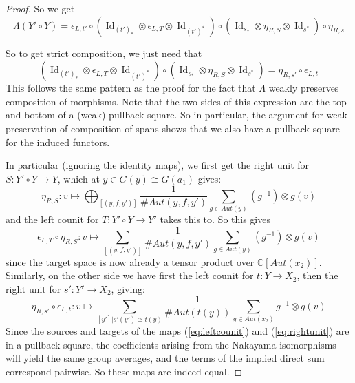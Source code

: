 \documentclass[10pt]{amsart}
\numberwithin{theorem}{subsection}
\newcommand{\ra}{\mathop{\rightarrow}}
\newcommand{\opname}[1]{\operatorname{#1}}
\newcommand{\Id}{\opname{Id}}
\newcommand{\FV}{\Lambda}
\begin{document}
\begin{proof}
So we get
\begin{equation}
\FV(Y' \circ Y) = \epsilon_{L,t'} \circ (\Id_{(t')_{\ast}} \otimes \epsilon_{L,T} \otimes \Id_{(t')^{\ast}}) \circ (\Id_{s_{\ast}} \otimes \eta_{R,S} \otimes \Id_{s^{\ast}}) \circ \eta_{R,s}
\end{equation}

So to get strict composition, we just need that
\begin{equation}
(\Id_{(t')_{\ast}} \otimes \epsilon_{L,T} \otimes \Id_{(t')^{\ast}}) \circ (\Id_{s_{\ast}} \otimes \eta_{R,S} \otimes \Id_{s^{\ast}}) = \eta_{R,s'} \circ \epsilon_{L,t}
\end{equation}
This follows the same pattern as the proof for the fact that $\FV$
weakly preserves composition of morphisms.  Note that the two sides of
this expression are the top and bottom of a (weak) pullback square.
So in particular, the argument for weak preservation of composition of
spans shows that we also have a pullback square for the induced
functors.

In particular (ignoring the identity maps), we first get the right
unit for $S : Y' \circ Y \ra Y$, which at $y \in G(y) \cong G(a_1)$ gives:
\begin{equation}
\eta_{R,S} : v \mapsto \bigoplus_{[(y,f,y')]} \frac{1}{\# Aut(y,f,y')} \sum_{g \in Aut(y)} (g^{-1}) \otimes g(v)
\end{equation}
and the left counit for $T : Y' \circ Y \ra Y'$ takes this to.  So this gives
\begin{equation}
\epsilon_{L,T} \circ \eta_{R,S}: v \mapsto \sum_{[(y,f,y')]} \frac{1}{\# Aut(y,f,y')} \sum_{g \in Aut(y)} (g^{-1}) \otimes g(v)
\end{equation}
since the target space is now already a tensor product over $\mathbb{C}[Aut(x_2)]$.  Similarly, on the other side we have first the left counit
for $t : Y \ra X_2$, then the right unit for $s' : Y' \ra X_2$, giving:
\begin{equation}
\eta_{R,s'} \circ \epsilon_{L,t} : v \mapsto \sum_{[y'] | s'(y') \cong t(y)} \frac{1}{\# Aut(t(y))} \sum_{g \in Aut(x_2)} g^{-1} \otimes g(v)
\end{equation}
Since the sources and targets of the maps (\ref{eq:leftcounit}) and
(\ref{eq:rightunit}) are in a pullback square, the coefficients
arising from the Nakayama isomorphisms will yield the same group averages, and the terms
of the implied direct sum correspond pairwise.  So these maps are indeed equal.
\end{proof}
\end{document}

